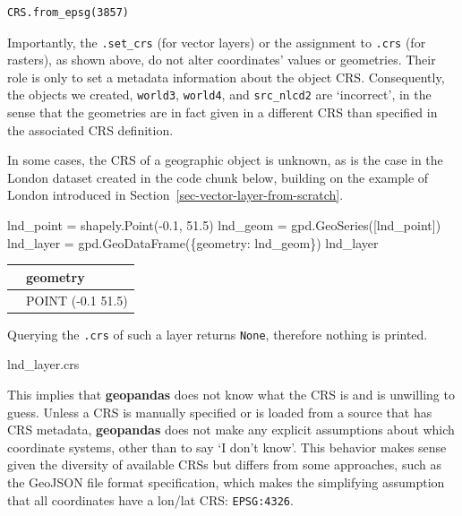 \documentclass[
  letterpaper,
]{krantz}
\newenvironment{Shaded}{\begin{snugshade}}{\end{snugshade}}
\newcommand{\FloatTok}[1]{\textcolor[rgb]{0.68,0.00,0.00}{#1}}
\newcommand{\NormalTok}[1]{\textcolor[rgb]{0.00,0.23,0.31}{#1}}
\newcommand{\OperatorTok}[1]{\textcolor[rgb]{0.37,0.37,0.37}{#1}}
\newcommand{\StringTok}[1]{\textcolor[rgb]{0.13,0.47,0.30}{#1}}
\begin{document}
\begin{verbatim}
CRS.from_epsg(3857)
\end{verbatim}

Importantly, the \texttt{.set\_crs} (for vector layers) or the
assignment to \texttt{.crs} (for rasters), as shown above, do not alter
coordinates' values or geometries. Their role is only to set a metadata
information about the object CRS. Consequently, the objects we created,
\texttt{world3}, \texttt{world4}, and \texttt{src\_nlcd2} are
`incorrect', in the sense that the geometries are in fact given in a
different CRS than specified in the associated CRS definition.

In some cases, the CRS of a geographic object is unknown, as is the case
in the London dataset created in the code chunk below, building on the
example of London introduced in
Section~\ref{sec-vector-layer-from-scratch}.

\begin{Shaded}
\begin{Highlighting}[]
\NormalTok{lnd\_point }\OperatorTok{=}\NormalTok{ shapely.Point(}\OperatorTok{{-}}\FloatTok{0.1}\NormalTok{, }\FloatTok{51.5}\NormalTok{)}
\NormalTok{lnd\_geom }\OperatorTok{=}\NormalTok{ gpd.GeoSeries([lnd\_point])}
\NormalTok{lnd\_layer }\OperatorTok{=}\NormalTok{ gpd.GeoDataFrame(\{}\StringTok{\textquotesingle{}geometry\textquotesingle{}}\NormalTok{: lnd\_geom\})}
\NormalTok{lnd\_layer}
\end{Highlighting}
\end{Shaded}

\begin{longtable}[]{@{}ll@{}}
\toprule\noalign{}
& geometry \\
\midrule\noalign{}
\endhead
\bottomrule\noalign{}
\endlastfoot
0 & POINT (-0.1 51.5) \\
\end{longtable}

Querying the \texttt{.crs} of such a layer returns \texttt{None},
therefore nothing is printed.

\begin{Shaded}
\begin{Highlighting}[]
\NormalTok{lnd\_layer.crs}
\end{Highlighting}
\end{Shaded}

This implies that \textbf{geopandas} does not know what the CRS is and
is unwilling to guess. Unless a CRS is manually specified or is loaded
from a source that has CRS metadata, \textbf{geopandas} does not make
any explicit assumptions about which coordinate systems, other than to
say `I don't know'. This behavior makes sense given the diversity of
available CRSs but differs from some approaches, such as the GeoJSON
file format specification, which makes the simplifying assumption that
all coordinates have a lon/lat CRS: \texttt{EPSG:4326}.
\end{document}
